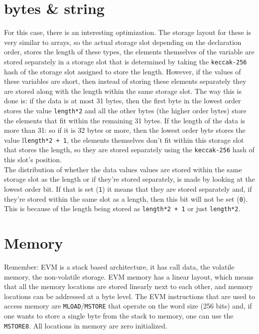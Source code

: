 \section{bytes \& string}
For this case, there is an interesting optimization. The storage layout for these is very similar to arrays, so the actual storage slot depending on the declaration order, stores the length of these types, the elements themselves of the variable are stored separately in a storage slot that is determined by taking the \verb|keccak-256| hash of the storage slot assigned to store the length. However, if the values of these variables are short, then instead of storing these elements separately they are stored along with the length within the same storage slot. The way this is done is: if the data is at most 31 bytes, then the first byte in the lowest order stores the value \verb|length*2| and all the other bytes (the higher order bytes) store the elements that fit within the remaining 31 bytes. If the length of the data is more than 31: so if it is 32 bytes or more, then the lowest order byte stores the value l\verb|length*2 + 1|, the elements themselves don't fit within this storage slot that stores the length, so they are stored separately using the \verb|keccak-256| hash of this slot's position.\\

The distribution of whether the data values values are stored within the same storage slot as the length or if they're stored separately, is made by looking at the lowest order bit. If that is set (\verb|1|) it means that they are stored separately and, if they're stored within the same slot as a length, then this bit will not be set (\verb|0|). This is because of the length being stored as \verb|length*2 + 1| or just \verb|length*2|.

\section{Memory}
Remember: EVM is a stack based architecture, it has call data, the volatile memory, the non-volatile storage. EVM memory has a linear layout, which means that all the memory locations are stored linearly next to each other, and memory locations can be addressed at a byte level. The EVM instructions that are used to access memory are \verb|MLOAD|/\verb|MSTORE| that operate on the word size (256 bits) and, if one wants to store a single byte from the stack to memory, one can use the \verb|MSTORE8|. All locations in memory are zero initialized.

